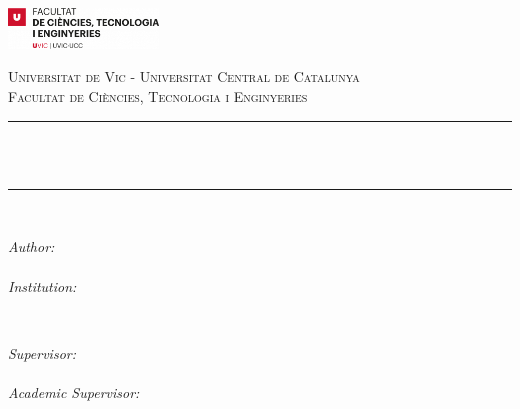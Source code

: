 \begin{titlepage}

\newcommand{\HRule}{\rule{\linewidth}{0.5mm}} %



\includegraphics[width = 4cm]{./figures/FCTE}\\[0.5cm] 

\center %


\textsc{\Large Universitat de Vic - Universitat Central de Catalunya}\\[0.5cm] 
\textsc{\large Facultat de Ciències, Tecnologia i Enginyeries}\\[0.5cm] 


\HRule \\[0.4cm]
{ \huge \bfseries \reporttitle}\\ %
\HRule \\[1.5cm]
 

\begin{minipage}{0.4\textwidth}
\begin{flushleft} \large
\emph{Author:}\\
\reportauthor \\[10pt]%
\emph{Institution:}\\
\institution %
\end{flushleft}
\end{minipage}
~
\begin{minipage}{0.4\textwidth}
\begin{flushright} \large
\emph{Supervisor:} \\
\supervisor \\[10pt] %
\emph{Academic Supervisor:}\\
\accsupervisor %
\end{flushright}
\end{minipage}\\[4cm]



\end{titlepage}
